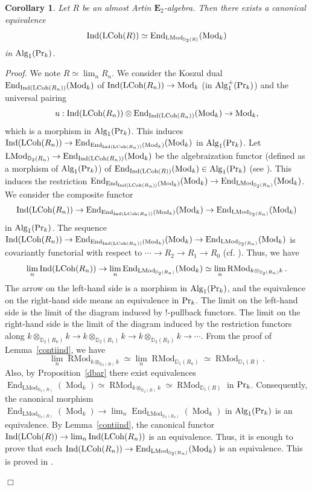 \documentclass[leqno,12pt]{amsart}
\theoremstyle{plain}
\newtheorem{Corollary}[Theorem]{Corollary}
\theoremstyle{definition}
\newcommand{\DD}{\mathbb{D}}
\newcommand{\PR}{\textup{Pr}}
\newcommand{\Mod}{\operatorname{Mod}}
\newcommand{\Alg}{\operatorname{Alg}}
\newcommand{\End}{\operatorname{End}}
\newcommand{\Ind}{\operatorname{Ind}}
\newcommand{\etwo}{\mathbf{E}_2}
\newcommand{\LMod}{\operatorname{LMod}}
\newcommand{\RMod}{\operatorname{RMod}}
\newcommand{\Proof}{{\sl Proof.}\quad}
\newcommand{\QED}{{\unskip\nobreak\hfil\penalty50\quad\null\nobreak\hfil
{$\Box$}\parfillskip0pt\finalhyphendemerits0\par\medskip}}
\begin{document}
\begin{Corollary}
\label{CKDA2}
Let $R$ be an almost Artin $\etwo$-algebra.
Then there exists a canonical equivalence
\[
\Ind(\textup{LCoh}(R))\simeq\End_{\LMod_{\DD_2(R)}}(\Mod_k)
\]
 in $\Alg_1(\PR_k)$.
\end{Corollary}


\Proof
We note $R\simeq \lim_{n}R_n$. 
We consider the Koszul dual $\End_{\Ind(\textup{LCoh}(R_n))}(\Mod_k)$ of $\Ind(\textup{LCoh}(R_n))\to \Mod_k$ (in $\Alg_1^+(\PR_k)$) and 
the universal pairing 
\[
u:\Ind(\textup{LCoh}(R_n))\otimes \End_{\Ind(\textup{LCoh}(R_n))}(\Mod_k)\to \Mod_k,
\]
which is a morphism in $\Alg_1(\PR_k)$.
This induces $\Ind(\textup{LCoh}(R_n))\to \End_{\End_{\Ind(\textup{LCoh}(R_n))}(\Mod_k)}(\Mod_k)$ in $\Alg_1(\PR_k)$.
Let $\LMod_{\DD_2(R_n)}\to \End_{\Ind(\textup{LCoh}(R_n))}(\Mod_k)$ be the algebraization functor (defined as a morphism of $\Alg_1(\PR_k)$)
of $\End_{\Ind(\textup{LCoh}(R))}(\Mod_k)\in \Alg_1(\PR_k)$ (see \cite[Lemma 3.3]{CKDA}).
This induces the restriction $\End_{\End_{\Ind(\textup{LCoh}(R_n))}(\Mod_k)}(\Mod_k)\to \End_{\LMod_{\DD_2(R_n)}}(\Mod_k)$.
We consider the composite functor 
\[
\Ind(\textup{LCoh}(R_n))\to \End_{\End_{\Ind(\textup{LCoh}(R_n))}(\Mod_k)}(\Mod_k)\to \End_{\LMod_{\DD_2(R_n)}}(\Mod_k)
\]
in $\Alg_1(\PR_k)$.
The sequence $\Ind(\textup{LCoh}(R_n))\to \End_{\End_{\Ind(\textup{LCoh}(R_n))}(\Mod_k)}(\Mod_k)\to \End_{\LMod_{\DD_2(R_n)}}(\Mod_k)$
is covariantly functorial with respect to $\cdots \to R_2\to R_1\to R_0$ (cf. \cite[Section 3]{CKDA}).
Thus, we have
\[
\lim_{n}\Ind(\textup{LCoh}(R_n)) \to \lim_{n}\End_{\LMod_{\DD_2(R_n)}}(\Mod_k)\simeq \lim_{n}\RMod_{k\otimes_{\DD_2(R_n)}k}.
\]
The arrow on the left-hand side is a morphism in $\Alg_1(\PR_k)$, and the equivalence on the right-hand side means an equivalence in $\PR_k$.
The limit on the left-hand side is the limit of the diagram induced by $!$-pullback functors.
The limit on the right-hand side is the limit of the diagram induced by the restriction functors along $k\otimes_{\DD_2(R_0)}k\to k\otimes_{\DD_2(R_1)}k\to k\otimes_{\DD_2(R_2)}k\to  \cdots$.
From the proof of Lemma~\ref{contiind}, we have
\[
 \lim_{n}\RMod_{k\otimes_{\DD_2(R)}k}\simeq \lim_n\RMod_{\DD_1(R_n)}\simeq \RMod_{\DD_1(R)}.
\]
Also, by Proposition~\ref{dbar} there exist equivalences $\End_{\LMod_{\DD_2(R)}}(\Mod_k)\simeq \RMod_{k\otimes_{\DD_2(R)}k}\simeq \RMod_{\DD_1(R)}$ in $\PR_k$.
Consequently, the canonical morphism $\End_{\LMod_{\DD_2(R)}}(\Mod_k) \to  \lim_{n}\End_{\LMod_{\DD_2(R_n)}}(\Mod_k)$ in $\Alg_1(\PR_k)$
is an equivalence. By Lemma~\ref{contiind}, the canonical functor $\Ind(\textup{LCoh}(R))\to \lim_{n}\Ind(\textup{LCoh}(R_n))$
is an equivalence. Thus, it is enough to prove that each $\Ind(\textup{LCoh}(R_n)) \to \End_{\LMod_{\DD_2(R_n)}}(\Mod_k)$ is an equivalence.
This is proved in \cite[Theorem 1.2]{CKDA}.
\QED
\end{document}
